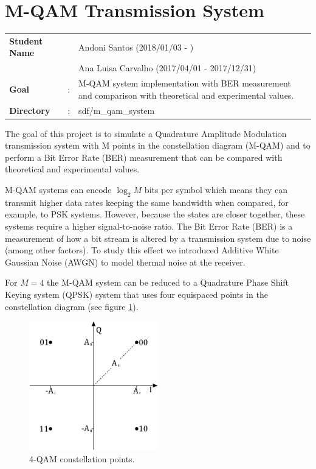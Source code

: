 \clearpage
\section{M-QAM Transmission System}

\begin{tcolorbox}	
	\begin{tabular}{p{2.75cm} p{0.2cm} p{10.5cm}} 	
		\textbf{Student Name}  & & Andoni Santos (2018/01/03 - )\\
							   & & Ana Luisa Carvalho (2017/04/01 - 2017/12/31) \\
		\textbf{Goal}          &:& M-QAM system implementation with BER measurement and comparison with theoretical and experimental values.\\
		\textbf{Directory} &:& sdf/m\_qam\_system
	\end{tabular}
\end{tcolorbox}

The goal of this project is to simulate a Quadrature Amplitude Modulation transmission system with M points in the constellation diagram (M-QAM) and to perform a Bit Error Rate (BER) measurement that can be compared with theoretical and experimental values.

M-QAM systems can encode $\log_2 M$ bits per symbol which means they can transmit higher data rates keeping the same bandwidth when compared, for example, to PSK systems. However, because the states are closer together, these systems require a higher signal-to-noise ratio.
The Bit Error Rate (BER) is a measurement of how a bit stream is altered by a transmission system due to noise (among other factors). To study this effect we introduced Additive White Gaussian Noise (AWGN) to model thermal noise at the receiver.

For $M=4$ the M-QAM system can be reduced to a Quadrature Phase Shift Keying system (QPSK) system that uses four equispaced points in the constellation diagram (see figure \ref{fig:const}).

\begin{figure}[h]
	\centering
	\includegraphics[width=0.5\textwidth]{./sdf/m_qam_system/figures/constellation.pdf}
	\caption{4-QAM constellation points.}
	\label{fig:const}
\end{figure}

